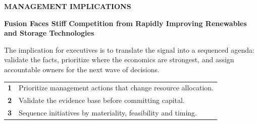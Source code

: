 \documentclass[10pt,a4paper]{article}
\begin{document}
\clearpage
{\textcolor{BOBlue}{\scriptsize\bfseries MANAGEMENT IMPLICATIONS}}\par\vspace{-1pt}
{\Large\sffamily\bfseries\color{BONavy} Fusion Faces Stiff Competition from Rapidly Improving Renewables and Storage Technologies}\par\vspace{4pt}
{\small The implication for executives is to translate the signal into a sequenced agenda: validate the facts, prioritize where the economics are strongest, and assign accountable owners for the next wave of decisions.}\par
\begin{tabularx}{\linewidth}{p{10mm}Y}
\textcolor{BOBlue}{\bfseries 1} & Prioritize management actions that change resource allocation. \\[5pt]
\textcolor{BOBlue}{\bfseries 2} & Validate the evidence base before committing capital. \\[5pt]
\textcolor{BOBlue}{\bfseries 3} & Sequence initiatives by materiality, feasibility and timing. \\[5pt]
\end{tabularx}
\vspace{6pt}

\vspace{6pt}{\textcolor{BOBlue}{\scriptsize\bfseries EXECUTION ROADMAP}}\par
\begin{center}
\end{center}
\end{document}
